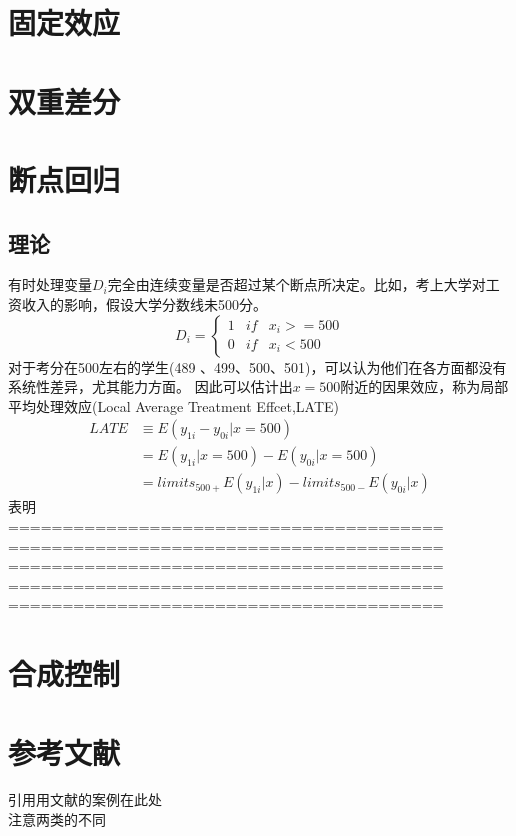 \documentclass{book}
\begin{document}
\chapter{固定效应}

\chapter{双重差分}

\chapter{断点回归}
\section{理论}
有时处理变量$D_i$完全由连续变量是否超过某个断点所决定。比如，考上大学对工资收入的影响，假设大学分数线未500分。
\begin{equation}
	 D_i=\left\{
		\begin{aligned}
		1 & if & x_i>=500\\
		0 & if & x_i<500
		\end{aligned}
		\right.
\end{equation}
对于考分在500左右的学生(489	、499、500、501)，可以认为他们在各方面都没有系统性差异，尤其能力方面。
因此可以估计出$x=500$附近的因果效应，称为局部平均处理效应(Local Average Treatment Effcet,LATE)
\begin{equation}
	\begin{aligned}
		LATE & \equiv E(y_{1i}-y_{0i}|x=500)\\
			 &= E(y_{1i}|x=500)-E(y_{0i}|x=500)\\
			 &= limits_{500+}E(y_{1i}|x)-limits_{500-}E(y_{0i}|x)
	\end{aligned}
\end{equation}
表明 \\ 
========================================\\
========================================\\
========================================\\
========================================\\
========================================\\
\chapter{合成控制} %
%
%
%

\chapter{参考文献}
引用用文献的案例在此处\citet{di_maio_2019}
\\ \citep{di_maio_2019}  注意两类的不同


\end{document}
